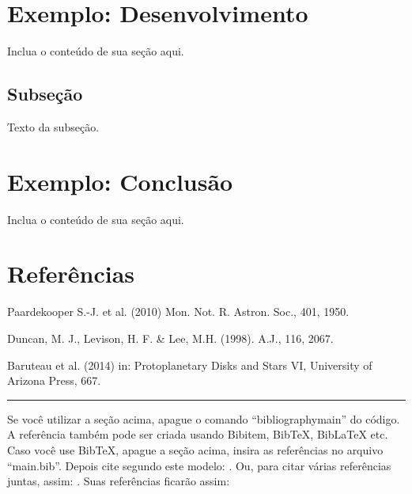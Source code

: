 \documentclass[12pt,a4paper,twoside]{article}
\begin{document}
\section{Exemplo: Desenvolvimento} %

 Inclua o conteúdo de sua seção aqui. \\ %

\subsection{Subseção}

Texto da subseção.

\section{Exemplo: Conclusão} %

Inclua o conteúdo de sua seção aqui. \\ %

\section*{Referências} %

\noindent Paardekooper S.-J. et al. (2010) Mon. Not. R. Astron. Soc., 401,
1950. %

\noindent Duncan, M. J., Levison, H. F. \& Lee, M.H. (1998). A.J., 116, 2067. %

\noindent Baruteau et al. (2014) in: Protoplanetary Disks and Stars VI, University of Arizona Press, 667. %

\vspace{\baselineskip} \hrule

\vspace{2\baselineskip}

Se você utilizar a seção acima, apague o comando ``bibliography{main}'' do código. A referência também pode ser criada usando Bibitem, BibTeX, BibLaTeX etc. Caso você use BibTeX, apague a seção acima, insira as referências no arquivo ``main.bib''. Depois cite segundo este modelo: \cite{greenwade93}. Ou, para citar várias referências juntas, assim: \cite{greenwade93,wikimedia-latex}. Suas referências ficarão assim:


\end{document}
